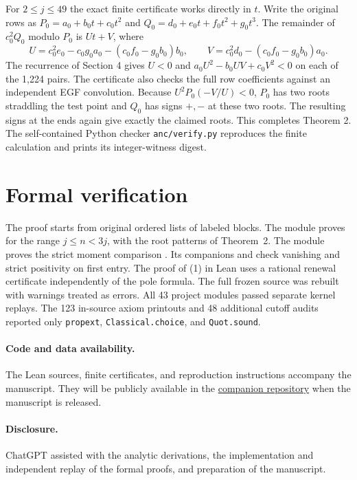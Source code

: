 \documentclass[11pt]{article}
\begin{document}
For \(2\le j\le49\) the exact finite certificate works directly in \(t\). Write the original rows as \(P_0=a_0+b_0t+c_0t^2\) and \(Q_0=d_0+e_0t+f_0t^2+g_0t^3\). The remainder of \(c_0^2Q_0\) modulo \(P_0\) is \(Ut+V\), where
\[
U=c_0^2e_0-c_0g_0a_0-(c_0f_0-g_0b_0)b_0,\qquad
V=c_0^2d_0-(c_0f_0-g_0b_0)a_0 .
\]
The recurrence of Section 4 gives \(U<0\) and \(a_0U^2-b_0UV+c_0V^2<0\) on each of the 1,224 pairs. The certificate also checks the full row coefficients against an independent EGF convolution. Because \(U^2 P_0(-V/U)<0\), \(P_0\) has two roots straddling the test point and \(Q_0\) has signs \(+,-\) at these two roots. The resulting signs at the ends again give exactly the claimed roots. This completes Theorem 2. The self-contained Python checker \texttt{anc/verify.py} reproduces the finite calculation and prints its integer-witness digest.


\section{Formal verification}
The proof starts from original ordered lists of labeled blocks.
The module  proves
 for the range \(j\le n<3j\), with
the root patterns of Theorem~2. The module 
proves the strict moment comparison .
Its companions  and  check
vanishing and strict positivity on first entry. The proof of (1) in
Lean uses a rational renewal certificate independently of the pole formula.
The full frozen source was rebuilt with warnings treated as errors.
All 43 project modules passed separate kernel replays. The 123 in-source
axiom printouts and 48 additional cutoff audits reported only
\texttt{propext}, \texttt{Classical.choice}, and \texttt{Quot.sound}.

\paragraph{Code and data availability.}
The Lean sources, finite certificates, and reproduction instructions accompany
the manuscript. They will be publicly available in the
\href{https://github.com/AlexZander-666/ordered-partition-large-blocks}{companion repository}
when the manuscript is released.

\paragraph{Disclosure.}
ChatGPT assisted with the analytic derivations, the implementation and
independent replay of the formal proofs, and preparation of the manuscript.
\end{document}
